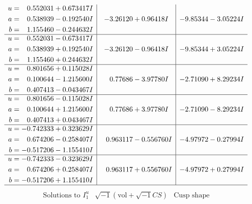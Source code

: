 \documentclass[1p]{elsarticle_modified}
\theoremstyle{definition}
\newcommand{\I}{\sqrt{-1}}
\begin{document}
$$\begin{array}{c|c|c}
\begin{aligned}
u &= \phantom{-}0.552031 + 0.673417 I \\
a &= \phantom{-}0.538939 - 0.192540 I \\
b &= \phantom{-}1.155460 - 0.244632 I\end{aligned}
 & -3.26120 + 0.96418 I & -9.85344 - 3.05224 I \\ \hline\begin{aligned}
u &= \phantom{-}0.552031 - 0.673417 I \\
a &= \phantom{-}0.538939 + 0.192540 I \\
b &= \phantom{-}1.155460 + 0.244632 I\end{aligned}
 & -3.26120 - 0.96418 I & -9.85344 + 3.05224 I \\ \hline\begin{aligned}
u &= \phantom{-}0.801656 + 0.115028 I \\
a &= \phantom{-}0.100644 - 1.215600 I \\
b &= \phantom{-}0.407413 - 0.043467 I\end{aligned}
 & \phantom{-}0.77686 - 3.97780 I & -2.71090 + 8.29234 I \\ \hline\begin{aligned}
u &= \phantom{-}0.801656 - 0.115028 I \\
a &= \phantom{-}0.100644 + 1.215600 I \\
b &= \phantom{-}0.407413 + 0.043467 I\end{aligned}
 & \phantom{-}0.77686 + 3.97780 I & -2.71090 - 8.29234 I \\ \hline\begin{aligned}
u &= -0.742333 + 0.323629 I \\
a &= \phantom{-}0.674206 - 0.258407 I \\
b &= -0.517206 - 1.155410 I\end{aligned}
 & \phantom{-}0.963117 - 0.556760 I & -4.97972 - 0.27994 I \\ \hline\begin{aligned}
u &= -0.742333 - 0.323629 I \\
a &= \phantom{-}0.674206 + 0.258407 I \\
b &= -0.517206 + 1.155410 I\end{aligned}
 & \phantom{-}0.963117 + 0.556760 I & -4.97972 + 0.27994 I\\
 \hline 
 \end{array}$$\newpage$$\begin{array}{c|c|c}  
\text{Solutions to }I^u_{1}& \I (\text{vol} + \sqrt{-1}CS) & \text{Cusp shape}\\

\end{array}$$
\end{document}

